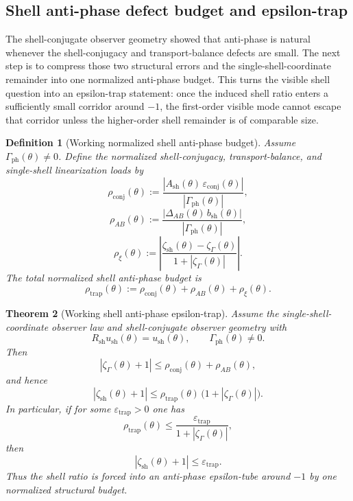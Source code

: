 \documentclass[12pt,a4paper]{article}
\newtheorem{theorem}{Theorem}[section]
\newtheorem{definition}[theorem]{Definition}
\begin{document}
\subsection*{Shell anti-phase defect budget and epsilon-trap}
The shell-conjugate observer geometry showed that anti-phase is natural whenever the shell-conjugacy and transport-balance defects are small. The next step is to compress those two structural errors and the single-shell-coordinate remainder into one normalized anti-phase budget. This turns the visible shell question into an epsilon-trap statement: once the induced shell ratio enters a sufficiently small corridor around $-1$, the first-order visible mode cannot escape that corridor unless the higher-order shell remainder is of comparable size.

\begin{definition}[Working normalized shell anti-phase budget]
Assume $\Gamma_{\mathrm{ph}}(\theta)\neq 0$. Define the normalized shell-conjugacy, transport-balance, and single-shell linearization loads by
\[
 \rho_{\mathrm{conj}}(\theta)
 :=
 \frac{|A_{\mathrm{sh}}(\theta)\,\varepsilon_{\mathrm{conj}}(\theta)|}{|\Gamma_{\mathrm{ph}}(\theta)|},
\]
\[
 \rho_{AB}(\theta)
 :=
 \frac{|\Delta_{AB}(\theta)\,b_{\mathrm{sh}}(\theta)|}{|\Gamma_{\mathrm{ph}}(\theta)|},
\]
\[
 \rho_{\xi}(\theta)
 :=
 \left|\frac{\zeta_{\mathrm{sh}}(\theta)-\zeta_{\Gamma}(\theta)}{1+|\zeta_{\Gamma}(\theta)|}\right|.
\]
The total normalized shell anti-phase budget is
\[
 \rho_{\mathrm{trap}}(\theta)
 :=
 \rho_{\mathrm{conj}}(\theta)+\rho_{AB}(\theta)+\rho_{\xi}(\theta).
\]
\end{definition}

\begin{theorem}[Working shell anti-phase epsilon-trap]
\label{thm:working-shell-anti-phase-epsilon-trap}
Assume the single-shell-coordinate observer law and shell-conjugate observer geometry with
\[
 R_{\mathrm{sh}}u_{\mathrm{sh}}(\theta)=u_{\mathrm{sh}}(\theta),
 \qquad
 \Gamma_{\mathrm{ph}}(\theta)\neq 0.
\]
Then
\[
 |\zeta_{\Gamma}(\theta)+1|
 \le
 \rho_{\mathrm{conj}}(\theta)+\rho_{AB}(\theta),
\]
and hence
\[
 |\zeta_{\mathrm{sh}}(\theta)+1|
 \le
 \rho_{\mathrm{trap}}(\theta)\,\bigl(1+|\zeta_{\Gamma}(\theta)|\bigr).
\]
In particular, if for some $\varepsilon_{\mathrm{trap}}>0$ one has
\[
 \rho_{\mathrm{trap}}(\theta)
 \le
 \frac{\varepsilon_{\mathrm{trap}}}{1+|\zeta_{\Gamma}(\theta)|},
\]
then
\[
 |\zeta_{\mathrm{sh}}(\theta)+1|\le \varepsilon_{\mathrm{trap}}.
\]
Thus the shell ratio is forced into an anti-phase epsilon-tube around $-1$ by one normalized structural budget.
\end{theorem}
\end{document}
